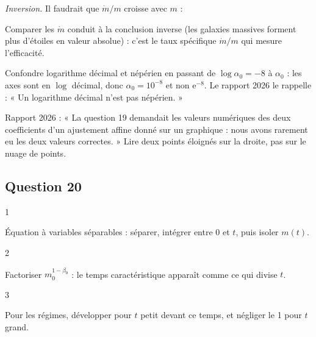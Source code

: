 \documentclass[11pt,a4paper]{article}
\newcommand{\equationajustee}[1]{%
  \sbox{\boiteequation}{$\displaystyle #1$}%
  \ifdim\wd\boiteequation>\linewidth
    \[\resizebox{\linewidth}{!}{\usebox{\boiteequation}}\]%
  \else
    \[#1\]%
  \fi}
\begin{document}
\emph{Inversion.} Il faudrait que \(\dot m/m\) croisse avec \(m\) :

\equationajustee{\boxed{\beta_0>1}}

\begin{piege}

Comparer les \(\dot m\) conduit à la conclusion inverse (les galaxies massives forment plus d'étoiles en valeur absolue) : c'est le taux spécifique \(\dot m/m\) qui mesure l'efficacité.

\end{piege}

\begin{piege}

Confondre logarithme décimal et népérien en passant de \(\log\alpha_0=-8\) à \(\alpha_0\) : les axes sont en \(\log\) décimal, donc \(\alpha_0=10^{-8}\) et non \(\mathrm e^{-8}\). Le rapport 2026 le rappelle : « Un logarithme décimal n'est pas népérien. »

\end{piege}

\begin{jury}

Rapport 2026 : « La question 19 demandait les valeurs numériques des deux coefficients d'un ajustement affine donné sur un graphique : nous avons rarement eu les deux valeurs correctes. » Lire deux points éloignés sur la droite, pas sur le nuage de points.

\end{jury}

\hypertarget{question-20}{%
\subsection{Question 20}\label{question-20}}

\begin{indication}{1}

Équation à variables séparables : séparer, intégrer entre \(0\) et \(t\), puis isoler \(m(t)\).

\end{indication}

\begin{indication}{2}

Factoriser \(m_0^{1-\beta_0}\) : le temps caractéristique apparaît comme ce qui divise \(t\).

\end{indication}

\begin{indication}{3}

Pour les régimes, développer pour \(t\) petit devant ce temps, et négliger le 1 pour \(t\) grand.

\end{indication}
\end{document}
